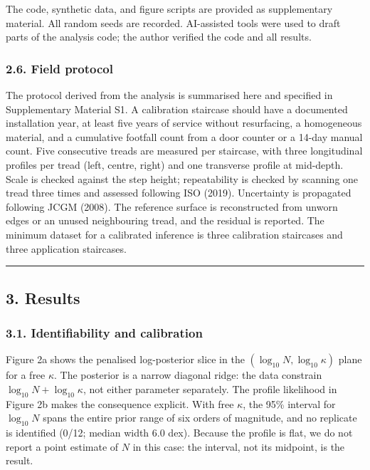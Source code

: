 \documentclass[
]{article}
\begin{document}
The code, synthetic data, and figure scripts are provided as
supplementary material. All random seeds are recorded. AI-assisted tools
were used to draft parts of the analysis code; the author verified the
code and all results.

\subsubsection{2.6. Field protocol}\label{field-protocol}

The protocol derived from the analysis is summarised here and specified
in Supplementary Material S1. A calibration staircase should have a
documented installation year, at least five years of service without
resurfacing, a homogeneous material, and a cumulative footfall count
from a door counter or a 14-day manual count. Five consecutive treads
are measured per staircase, with three longitudinal profiles per tread
(left, centre, right) and one transverse profile at mid-depth. Scale is
checked against the step height; repeatability is checked by scanning
one tread three times and assessed following ISO (2019). Uncertainty is
propagated following JCGM (2008). The reference surface is reconstructed
from unworn edges or an unused neighbouring tread, and the residual is
reported. The minimum dataset for a calibrated inference is three
calibration staircases and three application staircases.

\begin{center}\rule{0.5\linewidth}{0.5pt}\end{center}

\subsection{3. Results}\label{results}

\subsubsection{3.1. Identifiability and
calibration}\label{identifiability-and-calibration}

Figure 2a shows the penalised log-posterior slice in the
\((\log_{10}N,\log_{10}\kappa)\) plane for a free \(\kappa\). The
posterior is a narrow diagonal ridge: the data constrain
\(\log_{10}N+\log_{10}\kappa\), not either parameter separately. The
profile likelihood in Figure 2b makes the consequence explicit. With
free \(\kappa\), the 95\% interval for \(\log_{10}N\) spans the entire
prior range of six orders of magnitude, and no replicate is identified
(0/12; median width 6.0 dex). Because the profile is flat, we do not
report a point estimate of \(N\) in this case: the interval, not its
midpoint, is the result.
\end{document}

